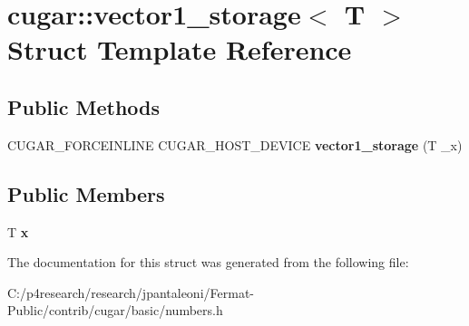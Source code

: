 \hypertarget{structcugar_1_1vector1__storage}{}\section{cugar\+:\+:vector1\+\_\+storage$<$ T $>$ Struct Template Reference}
\label{structcugar_1_1vector1__storage}
\subsection*{Public Methods}
\begin{DoxyCompactItemize}
\item 
\mbox{\label{structcugar_1_1vector1__storage_a48d33cbaca3bd7af2fcedfb7018f5278}} 
C\+U\+G\+A\+R\+\_\+\+F\+O\+R\+C\+E\+I\+N\+L\+I\+NE C\+U\+G\+A\+R\+\_\+\+H\+O\+S\+T\+\_\+\+D\+E\+V\+I\+CE {\bfseries vector1\+\_\+storage} (T \+\_\+x)
\end{DoxyCompactItemize}
\subsection*{Public Members}
\begin{DoxyCompactItemize}
\item 
\mbox{\label{structcugar_1_1vector1__storage_a28cf210ad24e756610cbc022f1752ff4}} 
T {\bfseries x}
\end{DoxyCompactItemize}


The documentation for this struct was generated from the following file\+:\begin{DoxyCompactItemize}
\item 
C\+:/p4research/research/jpantaleoni/\+Fermat-\/\+Public/contrib/cugar/basic/numbers.\+h\end{DoxyCompactItemize}
